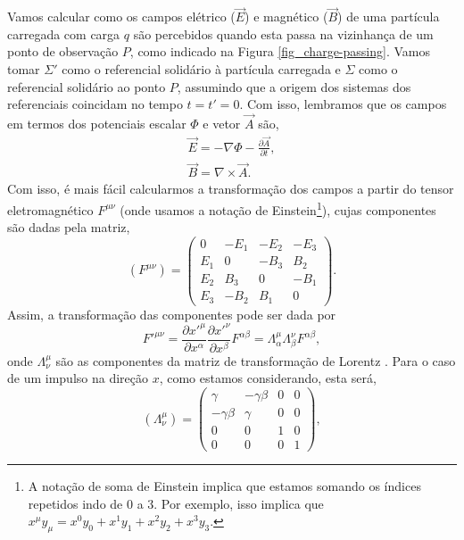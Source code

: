Vamos calcular como os campos elétrico ($\vec{E}$) e magnético ($\vec{B}$) de
uma partícula carregada com carga $q$ são percebidos quando esta passa na
vizinhança de um ponto de observação $P$, como indicado na Figura
\ref{fig_charge-passing}. Vamos tomar $\Sigma '$ como o referencial solidário à
partícula carregada e $\Sigma$ como o referencial solidário ao ponto $P$,
assumindo que a origem dos sistemas dos referenciais coincidam no tempo
$t=t'=0$. Com isso, lembramos que os campos em termos dos potenciais escalar
$\Phi$ e vetor $\vec{A}$ são,
\begin{gather}
	\vec{E} = - \nabla \Phi - \frac{\partial \vec{A}}{\partial t}, \\
	\vec{B} = \nabla \times \vec{A}.
\end{gather}
Com isso, é mais fácil calcularmos a transformação dos campos a partir do
tensor eletromagnético $F^{\mu \nu}$ (onde usamos a notação de
Einstein\footnote{A notação de soma de Einstein implica que estamos somando os
índices repetidos indo de 0 a 3. Por exemplo, isso implica que $x^\mu y_\mu =
x^0 y_0 + x^1 y_1 + x^2 y_2 + x^3 y_3$.}), cujas componentes são dadas pela
matriz,
\begin{equation}
    (F^{\mu \nu}) = \begin{pmatrix}
		0 & -E_1 & -E_2 & -E_3 \\
		E_1 & 0 & -B_3 & B_2 \\
		E_2 & B_3 & 0 & -B_1 \\
		E_3 & -B_2 & B_1 & 0
	\end{pmatrix}.
\end{equation}
Assim, a transformação das componentes pode ser dada por
\begin{equation}
    {F'}^{\mu \nu} = \frac{\partial {x'}^\mu}{\partial x^ \alpha}
    \frac{\partial {x'}^\nu}{\partial x^\beta}F^{\alpha \beta} = \Lambda ^\mu
    _\alpha \Lambda ^\nu _\beta F^{\alpha \beta},
    \label{eq_tensor_trans}
\end{equation}
onde $\Lambda ^\mu _\nu$ são as componentes da matriz de transformação de
Lorentz \cite{nivaldo_cap6}. Para o caso de um impulso na direção $x$, como
estamos considerando, esta será,
\begin{equation}
	(\Lambda ^\mu _\nu) = \begin{pmatrix}
		\gamma & -\gamma \beta & 0 & 0 \\
		-\gamma \beta & \gamma & 0 & 0 \\
		0 & 0 & 1 & 0 \\
		0 & 0 & 0 & 1
	\end{pmatrix},
\end{equation}
